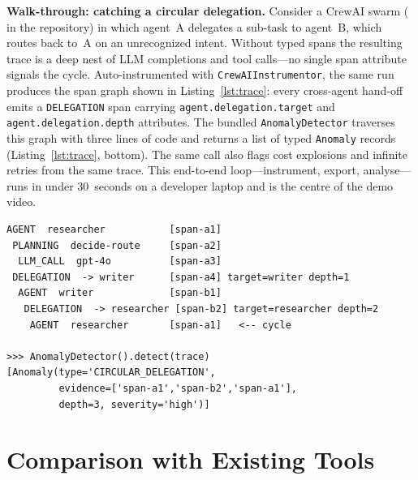 \documentclass[10pt,conference]{IEEEtran}
\begin{document}
\textbf{Walk-through: catching a circular delegation.}
Consider a CrewAI swarm ( in the
repository) in which agent~A delegates a
sub-task to agent~B, which routes back to~A on an unrecognized
intent. Without typed spans the resulting trace is a deep nest of
LLM completions and tool calls---no single span attribute
signals the cycle. Auto-instrumented with \texttt{CrewAIInstrumentor},
the same run produces the span graph shown in
Listing~\ref{lst:trace}: every cross-agent hand-off emits a
\texttt{DELEGATION} span carrying
\texttt{agent.delegation.target} and \texttt{agent.delegation.depth}
attributes. The bundled \texttt{AnomalyDetector} traverses this
graph with three lines of code and returns a list of typed
\texttt{Anomaly} records (Listing~\ref{lst:trace}, bottom). The
same call also flags cost explosions and infinite retries from the
same trace. This end-to-end loop---instrument, export,
analyse---runs in under 30~seconds on a developer laptop and is
the centre of the demo video.

\begin{lstlisting}[caption={Jaeger-style trace dump and \texttt{AnomalyDetector} output for the circular-delegation case.},label={lst:trace}]
AGENT  researcher           [span-a1]
 PLANNING  decide-route     [span-a2]
  LLM_CALL  gpt-4o          [span-a3]
 DELEGATION  -> writer      [span-a4] target=writer depth=1
  AGENT  writer             [span-b1]
   DELEGATION  -> researcher [span-b2] target=researcher depth=2
    AGENT  researcher       [span-a1]   <-- cycle

>>> AnomalyDetector().detect(trace)
[Anomaly(type='CIRCULAR_DELEGATION',
         evidence=['span-a1','span-b2','span-a1'],
         depth=3, severity='high')]
\end{lstlisting}

\section{Comparison with Existing Tools}
\label{sec:compare}
\end{document}
